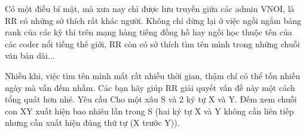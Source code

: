 Có một điều bí mật, mà xưa nay chỉ được lưu truyền giữa các admin VNOI, là RR có những sở thích rất khác người. Không chỉ dừng lại ở việc ngồi ngắm bảng rank của các kỳ thi trên mạng hàng tiếng đồng hồ hay ngồi học thuộc tên của các coder nổi tiếng thế giới, RR còn có sở thích tìm tên mình trong những chuỗi văn bản dài...  

   Nhiều khi, việc tìm tên mình mất rất nhiều thời gian, thậm chí có thể tốn nhiều ngày mà vẫn đếm nhầm. Các bạn hãy giúp RR giải quyết vấn đề này một cách tổng quát hơn nhé.
Yêu cầu
Cho một xâu S và 2 ký tự X và Y. Đếm xem chuỗi con XY xuất hiện bao nhiêu lần trong S (hai ký tự X và Y không cần liên tiếp nhưng cần xuất hiện đúng thứ tự (X trước Y)).